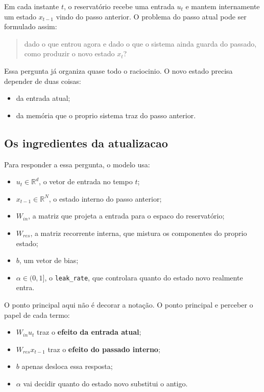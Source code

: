 \documentclass[12pt]{article}
\providecommand{\tightlist}{%
  \setlength{\itemsep}{0pt}\setlength{\parskip}{0pt}}
\begin{document}
Em cada instante \(t\), o reservatório recebe uma entrada \(u_t\) e mantem internamente um estado \(x_{t-1}\) vindo do passo anterior. O problema do passo atual pode ser formulado assim:

\begin{quote}
dado o que entrou agora e dado o que o sistema ainda guarda do passado, como produzir o novo estado \(x_t\)?
\end{quote}

Essa pergunta já organiza quase todo o raciocinio. O novo estado precisa depender de duas coisas:

\begin{itemize}
\tightlist
\item
  da entrada atual;
\item
  da memória que o proprio sistema traz do passo anterior.
\end{itemize}

\subsection{Os ingredientes da atualizacao}\label{32-os-ingredientes-da-atualizacao}

Para responder a essa pergunta, o modelo usa:

\begin{itemize}
\tightlist
\item
  \(u_t \in \mathbb{R}^d\), o vetor de entrada no tempo \(t\);
\item
  \(x_{t-1} \in \mathbb{R}^N\), o estado interno do passo anterior;
\item
  \(W_{in}\), a matriz que projeta a entrada para o espaco do reservatório;
\item
  \(W_{res}\), a matriz recorrente interna, que mistura os componentes do proprio estado;
\item
  \(b\), um vetor de bias;
\item
  \(\alpha \in (0,1]\), o \texttt{leak\_rate}, que controlara quanto do estado novo realmente entra.
\end{itemize}

O ponto principal aqui não é decorar a notação. O ponto principal e perceber o papel de cada termo:

\begin{itemize}
\tightlist
\item
  \(W_{in} u_t\) traz o \textbf{efeito da entrada atual};
\item
  \(W_{res} x_{t-1}\) traz o \textbf{efeito do passado interno};
\item
  \(b\) apenas desloca essa resposta;
\item
  \(\alpha\) vai decidir quanto do estado novo substitui o antigo.
\end{itemize}
\end{document}
